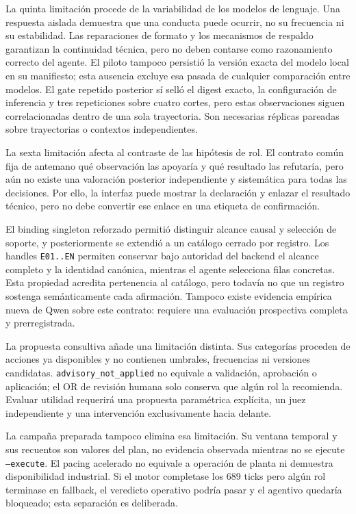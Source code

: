 La quinta limitación procede de la variabilidad de los modelos de lenguaje. Una
respuesta aislada demuestra que una conducta puede ocurrir, no su frecuencia ni
su estabilidad. Las reparaciones de formato y los mecanismos de respaldo
garantizan la continuidad técnica, pero no deben contarse como razonamiento correcto del
agente. El piloto tampoco persistió la versión exacta del modelo local en su
manifiesto; esta ausencia excluye esa pasada de cualquier comparación entre
modelos. El gate repetido posterior sí selló el digest exacto, la configuración
de inferencia y tres repeticiones sobre cuatro cortes, pero estas observaciones
siguen correlacionadas dentro de una sola trayectoria. Son necesarias réplicas
pareadas sobre trayectorias o contextos independientes.

La sexta limitación afecta al contraste de las hipótesis de rol. El contrato
común fija de antemano qué observación las apoyaría y qué resultado las
refutaría, pero aún no existe una valoración posterior independiente y
sistemática para todas las decisiones. Por ello, la interfaz puede mostrar la
declaración y enlazar el resultado técnico, pero no debe convertir ese enlace en
una etiqueta de confirmación.

El binding singleton reforzado permitió distinguir alcance causal y selección
de soporte, y posteriormente se extendió a un catálogo cerrado por registro.
Los handles \texttt{E01..EN} permiten conservar bajo autoridad del backend el
alcance completo y la identidad canónica, mientras el agente selecciona filas
concretas. Esta propiedad acredita pertenencia al catálogo, pero todavía no que
un registro sostenga semánticamente cada afirmación. Tampoco existe evidencia
empírica nueva de Qwen sobre este contrato: requiere una evaluación prospectiva
completa y prerregistrada.

La propuesta consultiva añade una limitación distinta. Sus categorías proceden
de acciones ya disponibles y no contienen umbrales, frecuencias ni versiones
candidatas. \texttt{advisory\_not\_applied} no equivale a validación,
aprobación o aplicación; el OR de revisión humana solo conserva que algún rol
la recomienda. Evaluar utilidad requerirá una propuesta paramétrica explícita,
un juez independiente y una intervención exclusivamente hacia delante.

La campaña preparada tampoco elimina esa limitación. Su ventana temporal y sus
recuentos son valores del plan, no evidencia observada mientras no se ejecute
\texttt{--execute}. El pacing acelerado no equivale a operación de planta ni
demuestra disponibilidad industrial. Si el motor completase los 689 ticks pero
algún rol terminase en fallback, el veredicto operativo podría pasar y el
agentivo quedaría bloqueado; esta separación es deliberada.

